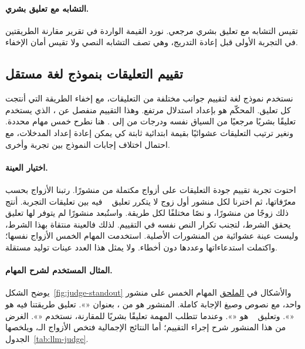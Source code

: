 \paragraph{التشابه مع تعليق بشري.}
تقيس  التشابه مع تعليق بشري مرجعي. نورد القيمة الواردة في تقرير مقارنة الطريقتين في التجربة الأولى قبل إعادة التدريج، وهي تصف التشابه النصي ولا تقيس أمان الإخفاء.

\subsection{تقييم التعليقات بنموذج لغة مستقل}

نستخدم نموذج لغة لتقييم جوانب مختلفة من التعليقات، مع إخفاء الطريقة التي أنتجت كل تعليق.
المحكّم هو  بإعداد استدلال مرتفع. وهذا التقييم منفصل عن ، الذي يستخدم تعليقًا بشريًا مرجعيًا من السياق نفسه ودرجات من  إلى .
هنا نطرح خمس مهام محددة. ونغير ترتيب التعليقات عشوائيًا بقيمة ابتدائية ثابتة كي يمكن إعادة إعداد المدخلات، مع احتمال اختلاف إجابات النموذج بين تجربة وأخرى.

\paragraph{اختيار العينة.}
احتوت تجربة تقييم جودة التعليقات على  أزواج مكتملة من  منشورًا.
رتبنا الأزواج بحسب معرّفاتها، ثم اخترنا لكل منشور أول زوج لا يتكرر تعليق ~\cite{lin2024zero} فيه بين تعليقات التجربة.
أنتج ذلك  زوجًا من  منشورًا، و نصًا مختلفًا لكل طريقة.
واستُبعد  منشورًا لم يتوفر لها تعليق يحقق الشرط، لتجنب تكرار النص نفسه في التقييم.
لذلك فالعينة منتقاة بهذا الشرط، وليست عينة عشوائية من المنشورات الأصلية.
استخدمت المهام الخمس الأزواج نفسها؛ واكتملت استدعاءاتها وعددها  دون أخطاء. ولا يمثل هذا العدد عينات توليد مستقلة.

\paragraph{المثال المستخدم لشرح المهام.}
يوضح الشكل~\ref{fig:judge-standout} والأشكال في \hyperref[app:judge-material]{الملحق} المهام الخمس على منشور واحد، مع نصوص  وصيغ الإجابة كاملة.
المنشور هو  من ، بعنوان «».
تعليق طريقتنا فيه هو «».
وتعليق ~\cite{lin2024zero} هو «».
وعندما تتطلب المهمة تعليقًا بشريًا للمقارنة، نستخدم «».
الغرض من هذا المنشور شرح إجراء التقييم؛ أما النتائج الإجمالية فتخص الأزواج الـ، ويلخصها الجدول~\ref{tab:llm-judge}.

